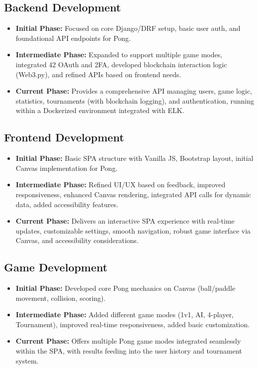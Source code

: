 \subsection*{Backend Development}
\begin{itemize}
    \item \textbf{Initial Phase:} Focused on core Django/DRF setup, basic user auth, and foundational API endpoints for Pong.
    \item \textbf{Intermediate Phase:} Expanded to support multiple game modes, integrated 42 OAuth and 2FA, developed blockchain interaction logic (Web3.py), and refined APIs based on frontend needs.
    \item \textbf{Current Phase:} Provides a comprehensive API managing users, game logic, statistics, tournaments (with blockchain logging), and authentication, running within a Dockerized environment integrated with ELK.
\end{itemize}

\subsection*{Frontend Development}
\begin{itemize}
    \item \textbf{Initial Phase:} Basic SPA structure with Vanilla JS, Bootstrap layout, initial Canvas implementation for Pong.
    \item \textbf{Intermediate Phase:} Refined UI/UX based on feedback, improved responsiveness, enhanced Canvas rendering, integrated API calls for dynamic data, added accessibility features.
    \item \textbf{Current Phase:} Delivers an interactive SPA experience with real-time updates, customizable settings, smooth navigation, robust game interface via Canvas, and accessibility considerations.
\end{itemize}

\subsection*{Game Development}
\begin{itemize}
    \item \textbf{Initial Phase:} Developed core Pong mechanics on Canvas (ball/paddle movement, collision, scoring).
    \item \textbf{Intermediate Phase:} Added different game modes (1v1, AI, 4-player, Tournament), improved real-time responsiveness, added basic customization.
    \item \textbf{Current Phase:} Offers multiple Pong game modes integrated seamlessly within the SPA, with results feeding into the user history and tournament system.
\end{itemize}

